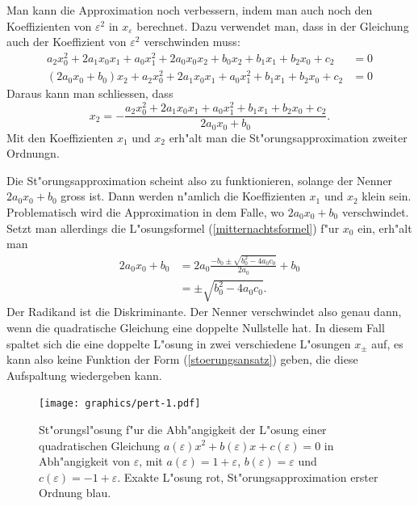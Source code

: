 Man kann die Approximation noch verbessern, indem man auch noch den
Koeffizienten von $\varepsilon^2$ in $x_\varepsilon$ berechnet.
Dazu verwendet man, dass in der Gleichung auch der Koeffizient von
$\varepsilon^2$ verschwinden muss:
\begin{align*}
a_2x_0^2 + 2a_1x_0x_1 + a_0x_1^2 +2a_0x_0x_2
+b_0x_2+b_1x_1+b_2x_0
+c_2
&=0
\\
(2a_0x_0+b_0)x_2
+a_2x_0^2 + 2a_1x_0x_1 + a_0x_1^2
+b_1x_1+b_2x_0
+c_2&=0
\end{align*}
Daraus kann man schliessen, dass
\[
x_2=-\frac{
a_2x_0^2 + 2a_1x_0x_1 + a_0x_1^2
+b_1x_1+b_2x_0
+c_2
}{2a_0x_0+b_0}.
\]
Mit den Koeffizienten $x_1$ und $x_2$ erh"alt man die St"orungsapproximation
zweiter Ordnungn.

Die St"orungsapproximation scheint also zu funktionieren, solange
der Nenner $2a_0x_0+b_0$ gross ist. Dann werden n"amlich die 
Koeffizienten $x_1$ und $x_2$ klein sein. Problematisch wird
die Approximation in dem Falle, wo $2a_0x_0+b_0$ verschwindet.
Setzt man allerdings die L"osungsformel (\ref{mitternachtsformel}) f"ur
$x_0$ ein, erh"alt man
\begin{align*}
2a_0x_0+b_0&=2a_0\frac{-b_0\pm\sqrt{b_0^2-4a_0c_0}}{2a_0}+b_0      \\
           &=\pm\sqrt{b_0^2-4a_0c_0}.
\end{align*}
Der Radikand ist die Diskriminante.
Der Nenner verschwindet also genau dann, wenn die quadratische
Gleichung eine doppelte Nullstelle hat. In diesem Fall spaltet sich
die eine doppelte L"osung in zwei verschiedene L"osungen $x_{\pm}$ auf,
es kann also keine Funktion der Form
(\ref{stoerungsansatz}) 
geben, die diese Aufspaltung wiedergeben kann.

\begin{figure}
\centering
\texttt{[image: graphics/pert-1.pdf]}
\caption{St"orungsl"osung f"ur die Abh"angigkeit der L"osung einer
quadratischen Gleichung $a(\varepsilon)x^2+b(\varepsilon)x+c(\varepsilon)=0$
in Abh"angigkeit von $\varepsilon$,
mit $a(\varepsilon)=1+\varepsilon$, $b(\varepsilon)=\varepsilon$ und
$c(\varepsilon)=-1+\varepsilon$. Exakte L"osung {\color{red} rot}, 
St"orungsapproximation erster Ordnung {\color{blue} blau}.
\label{stoerungsloesung}}
\end{figure}

